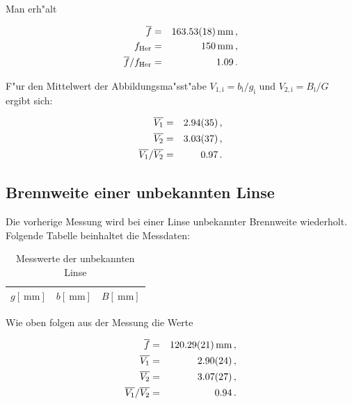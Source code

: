 		Man erh"alt

		\begin{eqnarray*}
			\overline{f} & = & \SI{163.53 (18)}{\milli \meter} \, , \\
			f_\mathrm{Her} & = & \SI{150}{\milli \meter} \, , \\
			\overline{f}/f_\mathrm{Her} & = & \SI{1.09}{} \, .
		\end{eqnarray*}

		F"ur den Mittelwert der Abbildungsma"sst"abe $V_{1\mathrm{,i}} = b_\mathrm{i}/g_\mathrm{i}$ und $V_{2\mathrm{,i}} = B_\mathrm{i}/G$ ergibt sich:

		\begin{eqnarray*}
			\overline{V_1} & = & \SI{2.94 (35)}{} \, , \\
			\overline{V_2} & = & \SI{3.03 (37)}{} \, , \\
			\overline{V_1}/\overline{V_2} & = & \SI{.97}{} \, .
		\end{eqnarray*}

	\clearpage

	\subsection{Brennweite einer unbekannten Linse}
		\label{subsec:unbekannte}
		Die vorherige Messung wird bei einer Linse unbekannter Brennweite wiederholt.
		Folgende Tabelle beinhaltet die Messdaten:

		\begin{table}[!h]
			\begin{center}
				\label{tabelle:unbekannt}
				\caption{Messwerte der unbekannten Linse}
				\begin{tabular}{|c|c|c|}
					\hline 
					$g [\SI{}{\milli \meter}]$ & $b [\SI{}{\milli \meter}]$ & $B [\SI{}{\milli \meter}]$ \\
					\hline 
					\hline
					
					\hline 
				\end{tabular}
			\end{center}
		\end{table}

		Wie oben folgen aus der Messung die Werte

		\begin{eqnarray*}
			\overline{f} & = & \SI{120.29 (21)}{\milli \meter} \, , \\
			\overline{V_1} & = & \SI{2.90 (24)}{} \, , \\
			\overline{V_2} & = & \SI{3.07 (27)}{} \, , \\
			\overline{V_1}/\overline{V_2} & = & \SI{.94}{} \, .
		\end{eqnarray*}


